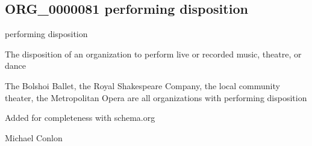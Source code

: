 \documentclass[letterpaper,10pt,english]{sphinxmanual}
\begin{document}
\subsection{ORG\_0000081 \sphinxhyphen{} performing disposition}
\label{\detokenize{doc-ORG_0000081:org-0000081-performing-disposition}}\label{\detokenize{doc-ORG_0000081:index-0}}\label{\detokenize{doc-ORG_0000081::doc}}
\begin{sphinxShadowBox}

\sphinxAtStartPar
performing disposition
\end{sphinxShadowBox}

\begin{sphinxShadowBox}

\sphinxAtStartPar
{\hyperref[\detokenize{doc-BFO_0000016::doc}]{}}
\end{sphinxShadowBox}

\begin{sphinxShadowBox}

\sphinxAtStartPar
The disposition of an organization to perform live or recorded music, theatre, or dance
\end{sphinxShadowBox}

\begin{sphinxShadowBox}

\sphinxAtStartPar
{}
\end{sphinxShadowBox}

\begin{sphinxShadowBox}

\sphinxAtStartPar
The Bolshoi Ballet, the Royal Shakespeare Company, the local community theater, the Metropolitan Opera are all organizations with performing disposition
\end{sphinxShadowBox}

\begin{sphinxShadowBox}

\sphinxAtStartPar
Added for completeness with schema.org
\end{sphinxShadowBox}

\begin{sphinxShadowBox}

\sphinxAtStartPar
Michael Conlon 
\end{sphinxShadowBox}
\begin{quote}

\ignorespaces \end{quote}
\end{document}
